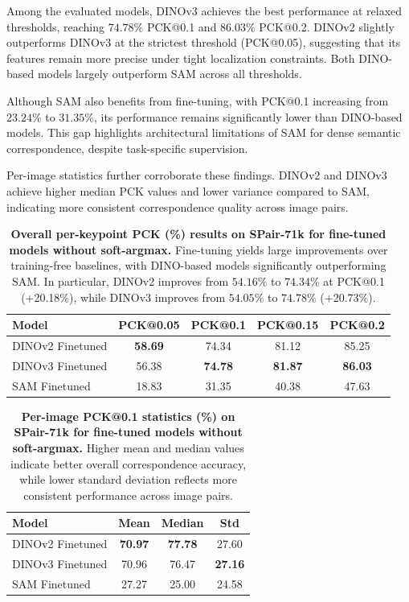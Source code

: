 Among the evaluated models, DINOv3 achieves the best performance at relaxed thresholds, reaching $74.78\%$ PCK@0.1 and $86.03\%$ PCK@0.2.
DINOv2 slightly outperforms DINOv3 at the strictest threshold (PCK@0.05), suggesting that its features remain more precise under tight localization constraints.
Both DINO-based models largely outperform SAM across all thresholds.

Although SAM also benefits from fine-tuning, with PCK@0.1 increasing from $23.24\%$ to $31.35\%$, its performance remains significantly lower than DINO-based models.
This gap highlights architectural limitations of SAM for dense semantic correspondence, despite task-specific supervision.

Per-image statistics further corroborate these findings.
DINOv2 and DINOv3 achieve higher median PCK values and lower variance compared to SAM, indicating more consistent correspondence quality across image pairs.


\begin{table}[t]
    \centering
    \setlength{\tabcolsep}{2pt}
    \caption{\textbf{Overall per-keypoint PCK (\%) results on SPair-71k for fine-tuned models without soft-argmax.}
    Fine-tuning yields large improvements over training-free baselines, with DINO-based models significantly outperforming SAM.
    In particular, DINOv2 improves from $54.16\%$ to $74.34\%$ at PCK@0.1 (+20.18\%), while DINOv3 improves from $54.05\%$ to $74.78\%$ (+20.73\%).}
    \label{tab:finetuned_keypoint}
    \begin{tabular}{lcccc}
        \toprule
        Model & PCK@0.05 & PCK@0.1 & PCK@0.15 & PCK@0.2 \\
        \midrule
        DINOv2 Finetuned & \textbf{58.69} & 74.34 & 81.12 & 85.25 \\
        DINOv3 Finetuned & 56.38 & \textbf{74.78} & \textbf{81.87} & \textbf{86.03} \\
        SAM Finetuned    & 18.83 & 31.35 & 40.38 & 47.63 \\
        \bottomrule
    \end{tabular}
\end{table}

\begin{table}[t]
    \centering
    \setlength{\tabcolsep}{6pt}
    \caption{
    \textbf{Per-image PCK@0.1 statistics (\%) on SPair-71k for fine-tuned models without soft-argmax.}
    Higher mean and median values indicate better overall correspondence accuracy,
    while lower standard deviation reflects more consistent performance across image pairs.}
    \label{tab:finetuned_image}
    \begin{tabular}{lccc}
        \toprule
        Model  & Mean & Median & Std \\
        \midrule
        DINOv2 Finetuned & \textbf{70.97} & \textbf{77.78} & 27.60 \\
        DINOv3 Finetuned & 70.96 & 76.47 & \textbf{27.16} \\
        SAM Finetuned    & 27.27 & 25.00 & 24.58 \\
        \bottomrule
    \end{tabular}
\end{table}


